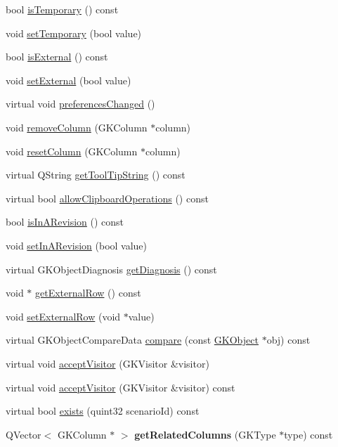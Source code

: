 \begin{DoxyCompactItemize}
\item 
bool \hyperlink{classGKObject_a960fc52fc9b7be6852d4591e6afc6584}{is\+Temporary} () const 
\item 
void \hyperlink{classGKObject_aba6adba0cebc98d0b7ba2e0d8a33c63a}{set\+Temporary} (bool value)
\item 
bool \hyperlink{classGKObject_ae2084342679907d99d81e1befbe5a35a}{is\+External} () const 
\item 
void \hyperlink{classGKObject_ab22a5ba2bcaa7c7f639e0ff0ec39b3c3}{set\+External} (bool value)
\item 
virtual void \hyperlink{classGKObject_a04c9b7bae9da3277fd0d96625539c974}{preferences\+Changed} ()
\item 
void \hyperlink{classGKObject_a52d73e24359bb5ad6ccdbbf02463cc9f}{remove\+Column} (G\+K\+Column $\ast$column)
\item 
void \hyperlink{classGKObject_a35ae238b96e5f5589cbe828fc7b78d16}{reset\+Column} (G\+K\+Column $\ast$column)
\item 
virtual Q\+String \hyperlink{classGKObject_a270fc001443a1c24c0f8d34353f2c69b}{get\+Tool\+Tip\+String} () const 
\item 
virtual bool \hyperlink{classGKObject_aed24065d688b9be828be91ddcc8e1603}{allow\+Clipboard\+Operations} () const 
\item 
bool \hyperlink{classGKObject_ac54ca7164f5048670b7b233f7dd070e3}{is\+In\+A\+Revision} () const 
\item 
void \hyperlink{classGKObject_a4d8757e7f3d7942ab55bca3ea183e9cf}{set\+In\+A\+Revision} (bool value)
\item 
virtual G\+K\+Object\+Diagnosis \hyperlink{classGKObject_ac76e3d7799e199d4a722aceff841ecae}{get\+Diagnosis} () const 
\item 
void $\ast$ \hyperlink{classGKObject_abe52120c6133b48eedfd0133828a1bf9}{get\+External\+Row} () const 
\item 
void \hyperlink{classGKObject_a0c1e0d22d45252a517575d34a5c7065a}{set\+External\+Row} (void $\ast$value)
\item 
virtual G\+K\+Object\+Compare\+Data \hyperlink{classGKObject_a6b22ecbae17d74a55bd9bc698641db86}{compare} (const \hyperlink{classGKObject}{G\+K\+Object} $\ast$obj) const 
\item 
virtual void \hyperlink{classGKObject_abd9a874f8e2a6da483136787335562d9}{accept\+Visitor} (G\+K\+Visitor \&visitor)
\item 
virtual void \hyperlink{classGKObject_a3f4d1001e500a2d4744483fbf422aee5}{accept\+Visitor} (G\+K\+Visitor \&visitor) const 
\item 
virtual bool \hyperlink{classGKObject_a089427722ccb540bc4d376102c4e3953}{exists} (quint32 scenario\+Id) const 
\item 
Q\+Vector$<$ G\+K\+Column $\ast$ $>$ {\bfseries get\+Related\+Columns} (G\+K\+Type $\ast$type) const \hypertarget{classGKObject_a68937bd2c123ad0fb9d426584ffcaa06}{}\label{classGKObject_a68937bd2c123ad0fb9d426584ffcaa06}


\end{DoxyCompactItemize}
